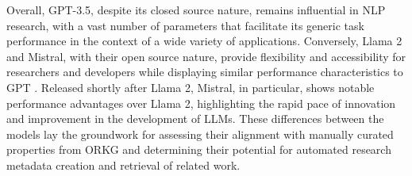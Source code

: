 Overall, GPT-3.5, despite its closed source nature, remains influential in NLP research, with a vast number of parameters that facilitate its generic task performance in the context of a wide variety of applications. Conversely, Llama 2 and Mistral, with their open source nature, provide flexibility and accessibility for researchers and developers while displaying similar performance characteristics to GPT \cite{llmLeaderboard}. Released shortly after Llama 2, Mistral, in particular, shows notable performance advantages over Llama 2, highlighting the rapid pace of innovation and improvement in the development of LLMs. These differences between the models lay the groundwork for assessing their alignment with manually curated properties from ORKG and determining their potential for automated research metadata creation and retrieval of related work.

